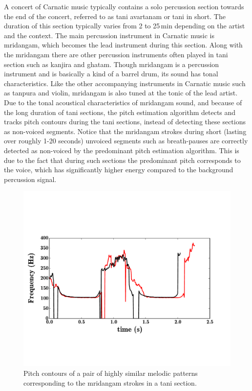 {A concert of Carnatic music typically contains a solo percussion section towards the end of the concert, referred to as \gls{tani} avartanam or \gls{tani} in short. The duration of this section typically varies from 2 to 25\,min depending on the artist and the context. The main percussion instrument in Carnatic music is \gls{mridangam}, which becomes the lead instrument during this section. Along with the \gls{mridangam} there are other percussion instruments often played in \gls{tani} section such as \gls{kanjira} and \gls{ghatam}. Though \gls{mridangam} is a percussion instrument and is basically a kind of a barrel drum, its sound has tonal characteristics. Like the other accompanying instruments in Carnatic music such as \gls{tanpura} and violin, \gls{mridangam} is also tuned at the tonic of the lead artist. Due to the tonal acoustical characteristics of \gls{mridangam} sound, and because of the long duration of \gls{tani} sections, the pitch estimation algorithm detects and tracks pitch contours during the \gls{tani} sections, instead of detecting these sections as non-voiced segments. Notice that the \gls{mridangam} strokes during short (lasting over roughly 1-20 seconds) unvoiced segments such as breath-pauses are correctly detected as non-voiced by the predominant pitch estimation algorithm. This is due to the fact that during such sections the predominant pitch corresponds to the voice, which has significantly higher energy compared to the background percussion signal. 


\begin{figure}
	\begin{center}
		\includegraphics[width=\figSizeNinety]{ch05_preprocessing/figures/taniPatterns.pdf}
	\end{center}
	\caption[Melodic patterns corresponding to the \gls{mridangam} strokes]{Pitch contours of a pair of highly similar melodic patterns corresponding to the \gls{mridangam} strokes in a \gls{tani} section.}
	\label{fig:pitch_pattern_tani}
\end{figure}

}
